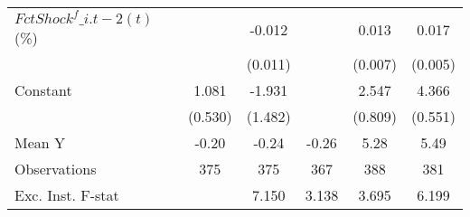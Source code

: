{\begin{tabular}{l*{5}{c}}
\addlinespace
$ FctShock^f\_{i.t-2}(t)$ (\%)&                     &      -0.012         &                     &       0.013\sym{*}  &       0.017\sym{***}\\
                    &                     &     (0.011)         &                     &     (0.007)         &     (0.005)         \\
\addlinespace
Constant            &       1.081\sym{*}  &      -1.931         &                     &       2.547\sym{***}&       4.366\sym{***}\\
                    &     (0.530)         &     (1.482)         &                     &     (0.809)         &     (0.551)         \\
\midrule
Mean Y              &       -0.20         &       -0.24         &       -0.26         &        5.28         &        5.49         \\
Observations        &         375         &         375         &         367         &         388         &         381         \\
Exc. Inst. F-stat   &                     &       7.150         &       3.138         &       3.695         &       6.199         \\
\bottomrule
\end{tabular}
}

